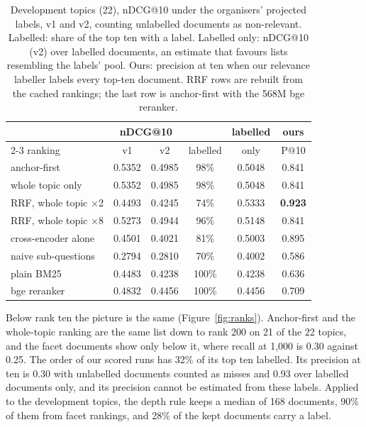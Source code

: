 \documentclass[sigconf,nonacm]{acmart}
\begin{document}
\begin{table}[t]
\caption{Development topics (22), nDCG@10 under the organisers' projected labels,
v1 and v2, counting unlabelled documents as non-relevant. Labelled: share of the top
ten with a label. Labelled only: nDCG@10 (v2) over labelled documents, an estimate
that favours lists resembling the labels' pool. Ours: precision at ten when our
relevance labeller labels every top-ten document. RRF rows are rebuilt from the cached
rankings; the last row is anchor-first with the 568M bge reranker.}
\label{tab:fusion}
\small
\setlength{\tabcolsep}{2.2pt}
\begin{tabular}{lccccc}
\toprule
 & \multicolumn{2}{c}{nDCG@10} & & labelled & ours \\
\cmidrule(lr){2-3}
ranking & v1 & v2 & labelled & only & P@10 \\
\midrule
anchor-first & 0.5352 & 0.4985 & 98\% & 0.5048 & 0.841 \\
whole topic only & 0.5352 & 0.4985 & 98\% & 0.5048 & 0.841 \\
RRF, whole topic $\times$2 & 0.4493 & 0.4245 & 74\% & 0.5333 & \textbf{0.923} \\
RRF, whole topic $\times$8 & 0.5273 & 0.4944 & 96\% & 0.5148 & 0.841 \\
cross-encoder alone & 0.4501 & 0.4021 & 81\% & 0.5003 & 0.895 \\
\midrule
naive sub-questions & 0.2794 & 0.2810 & 70\% & 0.4002 & 0.586 \\
plain BM25 & 0.4483 & 0.4238 & 100\% & 0.4238 & 0.636 \\
\midrule
bge reranker & 0.4832 & 0.4456 & 100\% & 0.4456 & 0.709 \\
\bottomrule
\end{tabular}
\end{table}

Below rank ten the picture is the same (Figure~\ref{fig:ranks}). Anchor-first and
the whole-topic ranking are the same list down to rank 200 on 21 of the 22 topics,
and the facet documents show only below it, where recall at 1,000 is 0.30 against
0.25. The order of our scored runs has 32\% of its top ten labelled. Its precision at
ten is 0.30 with unlabelled documents counted as misses and 0.93 over labelled
documents only, and its precision cannot be estimated from these labels. Applied to the
development topics, the depth rule keeps a median of 168 documents, 90\% of them from
facet rankings, and 28\% of the kept documents carry a label.
\end{document}
